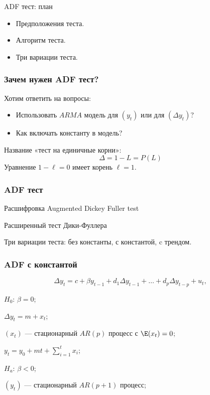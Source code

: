 
\begin{frame} %


\end{frame}



\begin{frame}{ADF тест: план}
  \begin{itemize}[<+->]
    \item Предположения теста.
    \item Алгоритм теста.
    \item Три вариации теста.
  \end{itemize}

\end{frame}


\begin{frame}
  \frametitle{Зачем нужен ADF тест?}

  Хотим ответить на вопросы:
  \pause
  \begin{itemize}[<+->]
    \item Использовать $ARMA$ модель для $(y_t)$ или для $(\Delta y_t)$?
    \item Как включать константу в модель?
  \end{itemize}

  \pause
  Название «тест на единичные корни»:
  \pause
  \[
  \Delta = 1 - L = P(L) 
  \]
  Уравнение $1 - \ell = 0$ имеет корень $\ell =1$.

\end{frame}

\begin{frame}
  \frametitle{ADF тест}
  
  \begin{block}{Расшифровка}
    Augmented Dickey Fuller test
    
    Расширенный тест Дики-Фуллера  
  \end{block}

  \pause 
  Три вариации теста: без константы, с константой, c трендом.
  
\end{frame}


\begin{frame}
  \frametitle{ADF с константой}
  \[
  \Delta y_t = c + \beta y_{t-1} + d_1 \Delta y_{t-1} + \ldots + d_p \Delta y_{t-p} + u_t,  
  \]

  \pause

  \alert{$H_0$: $\beta = 0$};
  
 $\Delta y_t = m + x_t$;

$(x_t)$ — стационарный $AR(p)$ процесс с $\E(x_t) = 0$;

  $y_t = y_0 + mt + \sum_{i=1}^t x_i$;

  \pause

  \alert{$H_a$: $\beta < 0$};

  $(y_t)$ — стационарный $AR(p + 1)$ процесс;

\end{frame}

